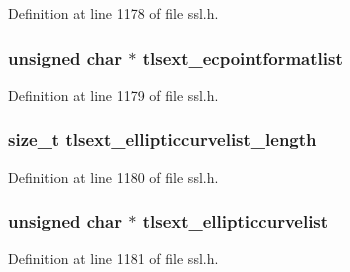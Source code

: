 Definition at line 1178 of file ssl.\+h.

\subsubsection[{\texorpdfstring{tlsext\+\_\+ecpointformatlist}{tlsext_ecpointformatlist}}]{\setlength{\rightskip}{0pt plus 5cm}unsigned char $\ast$ tlsext\+\_\+ecpointformatlist}\hypertarget{structssl__ctx__st_aed6a4a471306c6c96e1052966ed5b4cd}{}\label{structssl__ctx__st_aed6a4a471306c6c96e1052966ed5b4cd}


Definition at line 1179 of file ssl.\+h.

\subsubsection[{\texorpdfstring{tlsext\+\_\+ellipticcurvelist\+\_\+length}{tlsext_ellipticcurvelist_length}}]{\setlength{\rightskip}{0pt plus 5cm}size\+\_\+t tlsext\+\_\+ellipticcurvelist\+\_\+length}\hypertarget{structssl__ctx__st_a51510574a1159a9fb5ab06bf323945c6}{}\label{structssl__ctx__st_a51510574a1159a9fb5ab06bf323945c6}


Definition at line 1180 of file ssl.\+h.

\subsubsection[{\texorpdfstring{tlsext\+\_\+ellipticcurvelist}{tlsext_ellipticcurvelist}}]{\setlength{\rightskip}{0pt plus 5cm}unsigned char $\ast$ tlsext\+\_\+ellipticcurvelist}\hypertarget{structssl__ctx__st_afc8968e1fcae3767abbb9b981dc0ac75}{}\label{structssl__ctx__st_afc8968e1fcae3767abbb9b981dc0ac75}


Definition at line 1181 of file ssl.\+h.


